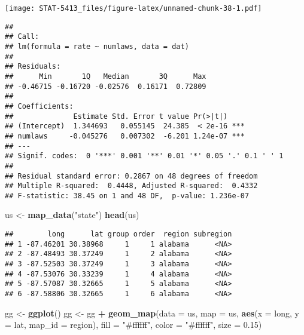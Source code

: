 \documentclass[]{book}
\newenvironment{Shaded}{\begin{snugshade}}{\end{snugshade}}
\newcommand{\DataTypeTok}[1]{\textcolor[rgb]{0.13,0.29,0.53}{#1}}
\newcommand{\FloatTok}[1]{\textcolor[rgb]{0.00,0.00,0.81}{#1}}
\newcommand{\KeywordTok}[1]{\textcolor[rgb]{0.13,0.29,0.53}{\textbf{#1}}}
\newcommand{\NormalTok}[1]{#1}
\newcommand{\OperatorTok}[1]{\textcolor[rgb]{0.81,0.36,0.00}{\textbf{#1}}}
\newcommand{\StringTok}[1]{\textcolor[rgb]{0.31,0.60,0.02}{#1}}
\begin{document}
\texttt{[image: STAT-5413\_files/figure-latex/unnamed-chunk-38-1.pdf]}

\begin{Shaded}
\end{Shaded}

\begin{verbatim}
## 
## Call:
## lm(formula = rate ~ numlaws, data = dat)
## 
## Residuals:
##      Min       1Q   Median       3Q      Max 
## -0.46715 -0.16720 -0.02576  0.16171  0.72809 
## 
## Coefficients:
##              Estimate Std. Error t value Pr(>|t|)    
## (Intercept)  1.344693   0.055145  24.385  < 2e-16 ***
## numlaws     -0.045276   0.007302  -6.201 1.24e-07 ***
## ---
## Signif. codes:  0 '***' 0.001 '**' 0.01 '*' 0.05 '.' 0.1 ' ' 1
## 
## Residual standard error: 0.2867 on 48 degrees of freedom
## Multiple R-squared:  0.4448, Adjusted R-squared:  0.4332 
## F-statistic: 38.45 on 1 and 48 DF,  p-value: 1.236e-07
\end{verbatim}

\begin{Shaded}
\begin{Highlighting}[]
\NormalTok{us <-}\StringTok{ }\KeywordTok{map_data}\NormalTok{(}\StringTok{"state"}\NormalTok{)}
\KeywordTok{head}\NormalTok{(us)}
\end{Highlighting}
\end{Shaded}

\begin{verbatim}
##        long      lat group order  region subregion
## 1 -87.46201 30.38968     1     1 alabama      <NA>
## 2 -87.48493 30.37249     1     2 alabama      <NA>
## 3 -87.52503 30.37249     1     3 alabama      <NA>
## 4 -87.53076 30.33239     1     4 alabama      <NA>
## 5 -87.57087 30.32665     1     5 alabama      <NA>
## 6 -87.58806 30.32665     1     6 alabama      <NA>
\end{verbatim}

\begin{Shaded}
\begin{Highlighting}[]
\NormalTok{gg <-}\StringTok{ }\KeywordTok{ggplot}\NormalTok{()}
\NormalTok{gg <-}\StringTok{ }\NormalTok{gg }\OperatorTok{+}\StringTok{ }\KeywordTok{geom_map}\NormalTok{(}\DataTypeTok{data =}\NormalTok{ us, }\DataTypeTok{map =}\NormalTok{ us,}
                    \KeywordTok{aes}\NormalTok{(}\DataTypeTok{x =}\NormalTok{ long, }\DataTypeTok{y =}\NormalTok{ lat, }\DataTypeTok{map_id =}\NormalTok{ region),}
                    \DataTypeTok{fill =} \StringTok{"#ffffff"}\NormalTok{, }\DataTypeTok{color =} \StringTok{"#ffffff"}\NormalTok{, }\DataTypeTok{size =} \FloatTok{0.15}\NormalTok{)}
\end{Highlighting}
\end{Shaded}
\end{document}
